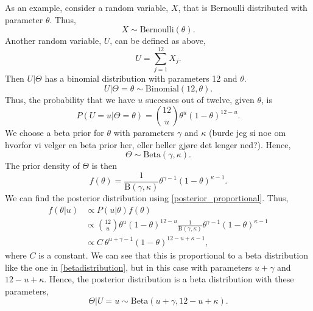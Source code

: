 As an example, consider a random variable, $X$, that is Bernoulli distributed with parameter $\theta$. Thus,
\begin{equation*}
    X \sim \mathrm{Bernoulli}(\theta).
\end{equation*}
Another random variable, $U$, can be defined as above, 
\begin{equation*}
    U = \sum_{j=1}^{12} X_j.
\end{equation*}
Then $U|\Theta$ has a binomial distribution with parameters 12 and $\theta$.
\begin{equation*}
    U|\Theta=\theta \sim \mathrm{Binomial}(12,\theta).
\end{equation*}
Thus, the probability that we have $u$ successes out of twelve, given $\theta$, is
\begin{equation*}
    P(U=u|\Theta=\theta) = \binom{12}{u} \theta^{u} (1-\theta)^{12-u}.
\end{equation*}
We choose a beta prior for $\theta$ with parameters $\gamma$ and $\kappa$ (burde jeg si noe om hvorfor vi velger en beta prior her, eller heller gjøre det lenger ned?). Hence,
\begin{equation*}
    \Theta \sim \mathrm{Beta}(\gamma,\kappa). 
\end{equation*}
The prior density of $\Theta$ is then
\begin{equation}
    \label{betadistribution}
    f(\theta) = \frac{1}{\mathrm{B}(\gamma,\kappa)}\theta^{\gamma-1}(1-\theta)^{\kappa-1}.
\end{equation}
We can find the posterior distribution using \eqref{posterior_proportional}. Thus,
\begin{equation*}
    \begin{aligned}
        f(\theta|u) 
        &\propto P(u|\theta)f(\theta)\\[6pt]
        &\propto \binom{12}{u} \theta^{u} (1-\theta)^{12-u} \frac{1}{\mathrm{B}(\gamma,\kappa)}\theta^{\gamma-1}(1-\theta)^{\kappa-1}\\[6pt]
        &\propto C \: \theta^{u+\gamma-1}(1-\theta)^{12-u+\kappa-1},
    \end{aligned}
\end{equation*}
where $C$ is a constant. We can see that this is proportional to a beta distribution like the one in \eqref{betadistribution}, but in this case with parameters $u+\gamma$ and $12-u+\kappa$. Hence, the posterior distribution is a beta distribution with these parameters, 
\begin{equation*}
    \Theta|U=u \sim \mathrm{Beta}(u+\gamma,12-u+\kappa).
\end{equation*}





